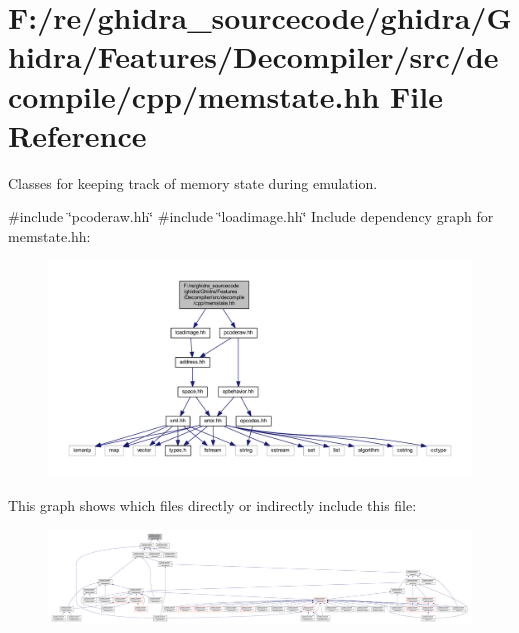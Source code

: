 \hypertarget{memstate_8hh}{}\section{F\+:/re/ghidra\+\_\+sourcecode/ghidra/\+Ghidra/\+Features/\+Decompiler/src/decompile/cpp/memstate.hh File Reference}
\label{memstate_8hh}


Classes for keeping track of memory state during emulation.  


{\ttfamily \#include \char`\"{}pcoderaw.\+hh\char`\"{}}\newline
{\ttfamily \#include \char`\"{}loadimage.\+hh\char`\"{}}\newline
Include dependency graph for memstate.\+hh\+:
\nopagebreak
\begin{figure}[H]
\begin{center}
\leavevmode
\includegraphics[width=350pt]{memstate_8hh__incl}
\end{center}
\end{figure}
This graph shows which files directly or indirectly include this file\+:
\nopagebreak
\begin{figure}[H]
\begin{center}
\leavevmode
\includegraphics[width=350pt]{memstate_8hh__dep__incl}
\end{center}
\end{figure}

